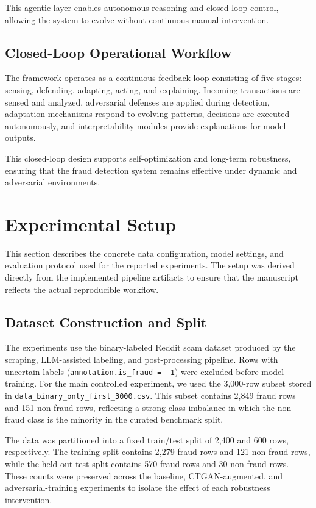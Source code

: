 \documentclass[conference]{IEEEtran}
\begin{document}
This agentic layer enables autonomous reasoning and closed-loop control, allowing the system to evolve without continuous manual intervention.

\subsection{Closed-Loop Operational Workflow}
The framework operates as a continuous feedback loop consisting of five stages: sensing, defending, adapting, acting, and explaining. Incoming transactions are sensed and analyzed, adversarial defenses are applied during detection, adaptation mechanisms respond to evolving patterns, decisions are executed autonomously, and interpretability modules provide explanations for model outputs.

This closed-loop design supports self-optimization and long-term robustness, ensuring that the fraud detection system remains effective under dynamic and adversarial environments.

\section{Experimental Setup}
This section describes the concrete data configuration, model settings, and evaluation protocol used for the reported experiments. The setup was derived directly from the implemented pipeline artifacts to ensure that the manuscript reflects the actual reproducible workflow.

\subsection{Dataset Construction and Split}
The experiments use the binary-labeled Reddit scam dataset produced by the scraping, LLM-assisted labeling, and post-processing pipeline. Rows with uncertain labels (\texttt{annotation.is\_fraud = -1}) were excluded before model training. For the main controlled experiment, we used the 3,000-row subset stored in \texttt{data\_binary\_only\_first\_3000.csv}. This subset contains 2,849 fraud rows and 151 non-fraud rows, reflecting a strong class imbalance in which the non-fraud class is the minority in the curated benchmark split.

The data was partitioned into a fixed train/test split of 2,400 and 600 rows, respectively. The training split contains 2,279 fraud rows and 121 non-fraud rows, while the held-out test split contains 570 fraud rows and 30 non-fraud rows. These counts were preserved across the baseline, CTGAN-augmented, and adversarial-training experiments to isolate the effect of each robustness intervention.
\end{document}

